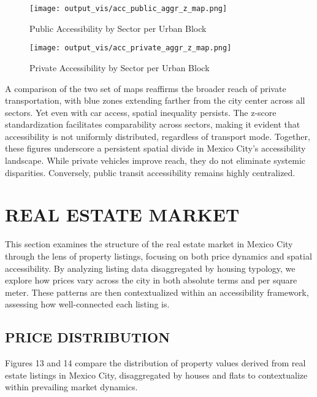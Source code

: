 \documentclass[
  12pt,
]{report}
\begin{document}
\begin{figure}[H]

{\centering \texttt{[image: output\_vis/acc\_public\_aggr\_z\_map.png]}

}

\caption{Public Accessibility by Sector per Urban Block}

\end{figure}%
\begin{figure}[H]

{\centering \texttt{[image: output\_vis/acc\_private\_aggr\_z\_map.png]}

}

\caption{Private Accessibility by Sector per Urban Block}

\end{figure}%

A comparison of the two set of maps reaffirms the broader reach of
private transportation, with blue zones extending farther from the city
center across all sectors. Yet even with car access, spatial inequality
persists. The z-score standardization facilitates comparability across
sectors, making it evident that accessibility is not uniformly
distributed, regardless of transport mode. Together, these figures
underscore a persistent spatial divide in Mexico City's accessibility
landscape. While private vehicles improve reach, they do not eliminate
systemic disparities. Conversely, public transit accessibility remains
highly centralized.

\section{REAL ESTATE MARKET}\label{real-estate-market}

This section examines the structure of the real estate market in Mexico
City through the lens of property listings, focusing on both price
dynamics and spatial accessibility. By analyzing listing data
disaggregated by housing typology, we explore how prices vary across the
city in both absolute terms and per square meter. These patterns are
then contextualized within an accessibility framework, assessing how
well-connected each listing is.

\subsection{PRICE DISTRIBUTION}\label{price-distribution}

Figures 13 and 14 compare the distribution of property values derived
from real estate listings in Mexico City, disaggregated by houses and
flats to contextualize within prevailing market dynamics.
\end{document}
